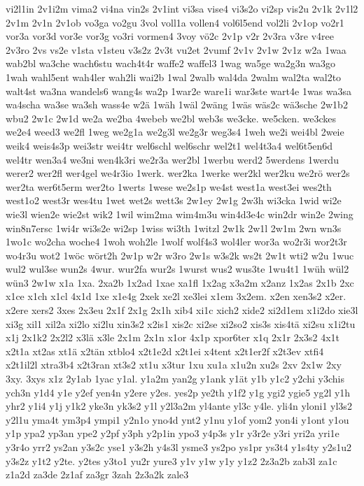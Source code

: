 {vi2l1in
2v1i2m
vima2
vi4na
vin2s
2v1int
vi3sa
vise4
vi3s2o
vi2sp
vis2u
2v1k
2v1l2
2v1m
2v1n
2v1ob
vo3ga
vo2gu
3vol
voll1a
vollen4
vol6l5end
vol2li
2v1op
vo2r1
vor3a
vor3d
vor3e
vor3g
vo3ri
vormen4
3voy
vö2c
2v1p
v2r
2v3ra
v3re
v4ree
2v3ro
2vs
vs2e
v1sta
v1steu
v3s2z
2v3t
vu2et
2vumf
2v1v
2v1w
2v1z
w2a
1waa
wab2bl
wa3che
wach6stu
wach4t4r
waffe2
waffel3
1wag
wa5ge
wa2g3n
wa3go
1wah
wahl5ent
wah4ler
wah2li
wai2b
1wal
2walb
wal4da
2walm
wal2ta
wal2to
walt4st
wa3na
wandels6
wang4s
wa2p
1war2e
ware1i
war3ste
wart4e
1was
wa3sa
wa4scha
wa3se
wa3sh
wass4e
w2ä
1wäh
1wäl
2wäng
1wäs
wäs2c
wä3sche
2w1b2
wbu2
2w1c
2w1d
we2a
we2ba
4webeb
we2bl
web3s
we3cke.
we5cken.
we3ckes
we2e4
weed3
we2fl
1weg
we2g1a
we2g3l
we2g3r
weg3s4
1weh
we2i
wei4bl
2weie
weik4
weis4s3p
wei3str
wei4tr
wel6schl
wel6schr
wel2t1
wel4t3a4
wel6t5en6d
wel4tr
wen3a4
we3ni
wen4k3ri
we2r3a
wer2bl
1werbu
werd2
5werdens
1werdu
werer2
wer2fl
wer4gel
we4r3io
1werk.
wer2ka
1werke
wer2kl
wer2ku
we2rö
wer2s
wer2ta
wer6t5erm
wer2to
1werts
1wese
we2s1p
we4st
west1a
west3ei
wes2th
west1o2
west3r
wes4tu
1wet
wet2s
wett3s
2w1ey
2w1g
2w3h
wi3cka
1wid
wi2e
wie3l
wien2e
wie2st
wik2
1wil
wim2ma
wim4m3u
win4d3e4c
win2dr
win2e
2wing
win8n7ersc
1wi4r
wi3s2e
wi2sp
1wiss
wi3th
1witzl
2w1k
2w1l
2w1m
2wn
wn3s
1wo1c
wo2cha
woche4
1woh
woh2le
1wolf
wolf4s3
wol4ler
wor3a
wo2r3i
wor2t3r
wo4r3u
wot2
1wöc
wört2h
2w1p
w2r
w3ro
2w1s
w3s2k
ws2t
2w1t
wti2
w2u
1wuc
wul2
wul3se
wun2s
4wur.
wur2fa
wur2s
1wurst
wus2
wus3te
1wu4t1
1wüh
wül2
wün3
2w1w
x1a
1xa.
2xa2b
1x2ad
1xae
xa1fl
1x2ag
x3a2m
x2anz
1x2as
2x1b
2xc
x1ce
x1ch
x1cl
4x1d
1xe
x1e4g
2xek
xe2l
xe3lei
x1em
3x2em.
x2en
xen3s2
x2er.
x2ere
xers2
3xes
2x3eu
2x1f
2x1g
2x1h
xib4
xi1c
xich2
xide2
xi2d1em
x1i2do
xie3l
xi3g
xil1
xil2a
xi2lo
xi2lu
xin3s2
x2is1
xis2c
xi2se
xi2so2
xis3s
xis4tä
xi2su
x1i2tu
x1j
2x1k2
2x2l2
x3lä
x3le
2x1m
2x1n
x1or
4x1p
xpor6ter
x1q
2x1r
2x3s2
4x1t
x2t1a
xt2as
xt1ä
x2tän
xtblo4
x2t1e2d
x2t1ei
x4tent
x2t1er2f
x2t3ev
xtfi4
x2t1il2l
xtra3b4
x2t3ran
xt3s2
xt1u
x3tur
1xu
xu1a
x1u2n
xu2s
2xv
2x1w
2xy
3xy.
3xys
x1z
2y1ab
1yac
y1al.
y1a2m
yan2g
y1ank
y1ät
y1b
y1c2
y2chi
y3chis
ych3n
y1d4
y1e
y2ef
yen4n
y2ere
y2es.
yes2p
ye2th
y1f2
y1g
ygi2
ygie5
yg2l
y1h
yhr2
y1i4
y1j
y1k2
yke3n
yk3s2
y1l
y2l3a2m
yl4ante
yl3c
y4le.
yli4n
yloni1
yl3s2
y2l1u
yma4t
ym3p4
ympi1
y2n1o
yno4d
ynt2
y1nu
y1of
yom2
yon4i
y1ont
y1ou
y1p
ypa2
yp3an
ype2
y2pf
y3ph
y2p1in
ypo3
y4p3s
y1r
y3r2e
y3ri
yri2a
yri1e
y3r4o
yrr2
ys2an
y3s2c
yse1
y3s2h
y4s3l
ysme3
ys2po
ys1pr
ys3t4
y1s4ty
y2s1u2
y3s2z
y1t2
y2te.
y2tes
y3to1
yu2r
yure3
y1v
y1w
y1y
y1z2
2z3a2b
zab3l
za1c
z1a2d
za3de
2z1af
za3gr
3zah
2z3a2k
zale3
}
